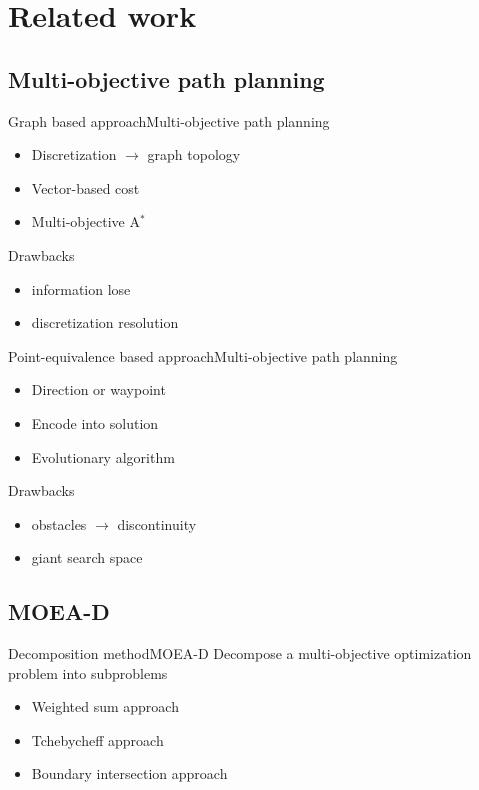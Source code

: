 \section{Related work}

\subsection{Multi-objective path planning}

\begin{frame}{Graph based approach}{Multi-objective path planning}
\begin{itemize}
\item Discretization $ \rightarrow $ graph topology
\item Vector-based cost
\item Multi-objective A$ ^{*}$
\end{itemize}
Drawbacks
\begin{itemize}
\item information lose
\item discretization resolution
\end{itemize}
\end{frame}

\begin{frame}{Point-equivalence based approach}{Multi-objective path planning}
\begin{itemize}
\item Direction or waypoint 
\item Encode into solution
\item Evolutionary algorithm
\end{itemize}
Drawbacks
\begin{itemize}
\item obstacles $ \rightarrow $ discontinuity
\item giant search space
\end{itemize}
\end{frame}

\subsection{MOEA-D}

\begin{frame}{Decomposition method}{MOEA-D}
	Decompose a multi-objective optimization problem into subproblems
	\begin{itemize}
		\item Weighted sum approach
		\item Tchebycheff approach
		\item Boundary intersection approach
	\end{itemize}
\end{frame}

